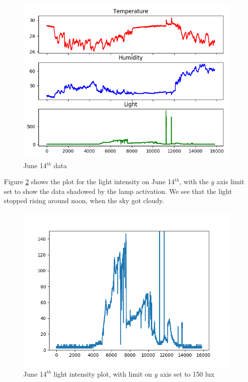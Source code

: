 \documentclass[11pt]{article}
\begin{document}
\begin{figure}[h]
\includegraphics[width=\textwidth]{log-20170514}
\caption{June 14$^{th}$ data}
\label{fig:june14}
\end{figure}

Figure \ref{fig:june14light} shows the plot for the light intensity on June 14$^{th}$, with the $y$ axis limit set to show the data shadowed by the lamp activation. We see that the light stopped rising around noon, when the sky got cloudy. 

\begin{figure}[h]
\includegraphics[width=\textwidth]{log-20170514-light}
\caption{June 14$^{th}$ light intensity plot, with limit on $y$ axis set to 150 lux}
\label{fig:june14light}
\end{figure}
\end{document}
